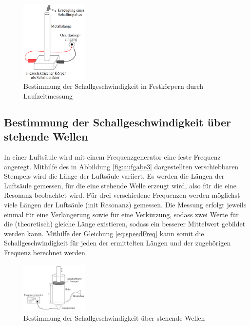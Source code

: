 \begin{figure}
\begin{center}
\includegraphics[width=0.3\textwidth]{Bilder/Versuchsaufbau2.png}
\caption{Bestimmung der Schallgeschwindigkeit in Festkörpern durch Laufzeitmessung}
\label{fig:versuch2}
\end{center}
\end{figure}

\subsection{Bestimmung der Schallgeschwindigkeit über stehende Wellen}
In einer Luftsäule wird mit einem Frequenzgenerator eine feste Frequenz angeregt. Mithilfe des in Abbildung \ref{fig:aufgabe3} dargestellten verschiebbaren Stempels wird die Länge der Luftsäule variiert. Es werden die Längen der Luftsäule gemessen, für die eine stehende Welle erzeugt wird, also für die eine Resonanz beobachtet wird. Für drei verschiedene Frequenzen werden möglichst viele Längen der Luftsäule (mit Resonanz) gemessen. Die Messung erfolgt jeweils einmal für eine Verlängerung sowie für eine Verkürzung, sodass zwei Werte für die (theoretisch) gleiche Länge existieren, sodass ein besserer Mittelwert gebildet werden kann. Mithilfe der Gleichung \ref{eq:speedFreq} kann somit die Schallgeschwindigkeit für jeden der ermittelten Längen und der zugehörigen Frequenz berechnet werden.


\begin{figure}
\begin{center}
\includegraphics[width=0.3\textwidth]{Bilder/Versuchsaufbau3.png}
\caption{Bestimmung der Schallgeschwindigkeit über stehende Wellen}
\label{fig:versuch3}
\end{center}
\end{figure}


